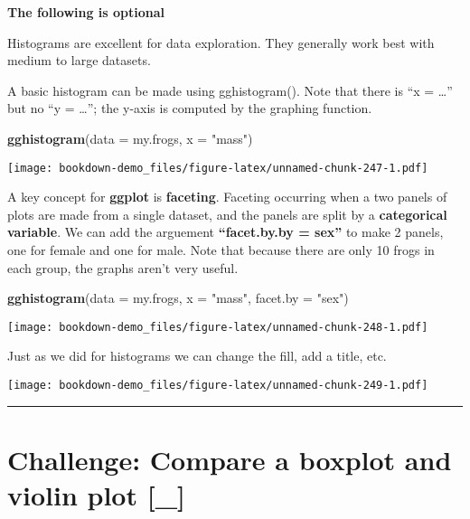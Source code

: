 \documentclass[]{book}
\newenvironment{Shaded}{\begin{snugshade}}{\end{snugshade}}
\newcommand{\KeywordTok}[1]{\textcolor[rgb]{0.13,0.29,0.53}{\textbf{#1}}}
\newcommand{\DataTypeTok}[1]{\textcolor[rgb]{0.13,0.29,0.53}{#1}}
\newcommand{\StringTok}[1]{\textcolor[rgb]{0.31,0.60,0.02}{#1}}
\newcommand{\NormalTok}[1]{#1}
\theoremstyle{definition}
\theoremstyle{definition}
\theoremstyle{definition}
\theoremstyle{remark}
\begin{document}
\textbf{The following is optional}

Histograms are excellent for data exploration. They generally work best
with medium to large datasets.

A basic histogram can be made using gghistogram(). Note that there is
``x = \ldots{}'' but no ``y = \ldots{}''; the y-axis is computed by the
graphing function.

\begin{Shaded}
\begin{Highlighting}[]
\KeywordTok{gghistogram}\NormalTok{(}\DataTypeTok{data =}\NormalTok{ my.frogs, }
            \DataTypeTok{x =} \StringTok{"mass"}\NormalTok{)}
\end{Highlighting}
\end{Shaded}

\texttt{[image: bookdown-demo\_files/figure-latex/unnamed-chunk-247-1.pdf]}

A key concept for \textbf{ggplot} is \textbf{faceting}. Faceting
occurring when a two panels of plots are made from a single dataset, and
the panels are split by a \textbf{categorical variable}. We can add the
arguement \textbf{``facet.by.by = sex''} to make 2 panels, one for
female and one for male. Note that because there are only 10 frogs in
each group, the graphs aren't very useful.

\begin{Shaded}
\begin{Highlighting}[]
\KeywordTok{gghistogram}\NormalTok{(}\DataTypeTok{data =}\NormalTok{ my.frogs, }
            \DataTypeTok{x =} \StringTok{"mass"}\NormalTok{,}
            \DataTypeTok{facet.by =} \StringTok{"sex"}\NormalTok{)}
\end{Highlighting}
\end{Shaded}

\texttt{[image: bookdown-demo\_files/figure-latex/unnamed-chunk-248-1.pdf]}

Just as we did for histograms we can change the fill, add a title, etc.

\texttt{[image: bookdown-demo\_files/figure-latex/unnamed-chunk-249-1.pdf]}

\begin{center}\rule{0.5\linewidth}{\linethickness}\end{center}

\section{Challenge: Compare a boxplot and violin plot
{[}\_{]}}\label{challenge-compare-a-boxplot-and-violin-plot-_}
\end{document}
